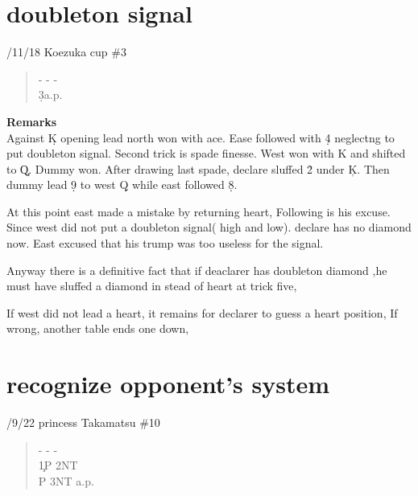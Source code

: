 {\section{doubleton signal}
/11/18 Koezuka cup \#3
\begin{quote}
%
  {}%
  {}%
  {}%
  {}%
\end{quote}
\begin{quote}
\begin{bidding}
- \>- \> - \s   \\
3\d  {}\s \>a.p. \\
 
\end{bidding}
 \end{quote}
{\bf Remarks}\\

Against \d K opening lead north won with ace.
Ease followed with \d 4 neglectng to put doubleton
signal.
Second trick is spade finesse. West won with \s K and
shifted to \c Q. Dummy won. After drawing last spade,
declare sluffed  \h 2 under \c K. Then dummy lead \d 9
to west \d Q  while east followed \d 8.

At this point east made a mistake by returning heart,
Following is his excuse.
Since west did not put a doubleton signal( high and low).
declare has no diamond now.
East excused that his trump was too  useless for the signal.

Anyway there is a definitive fact that if deaclarer has
doubleton diamond ,he must have sluffed a diamond in stead
of heart at trick five,

If west did not lead a heart, it remains for declarer to guess a
heart position,  If wrong, another table ends one down,



\section{recognize opponent's system}
/9/22 princess Takamatsu \#10
\begin{quote}
%
  {}%
  {}%
  {}%
  {}%
\end{quote}
\begin{quote}
\begin{bidding}
- \> - \> -\d   \\
1\s {}\c \>P \> 2NT \\
P \> 3NT \>a.p. \\
 

\end{bidding}
\end{quote}}
